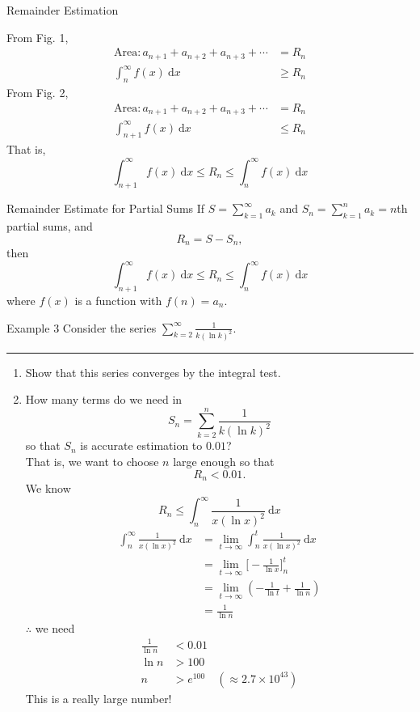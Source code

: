 \documentclass[12pt,a4paper]{article}
\def\d{{\mathrm{d}}}
\def\dx{\d x}
\begin{document}
\begin{eg}{Remainder Estimation}
\begin{itemize}
	From Fig. 1, $$\begin{aligned}\text{Area}: a_{n+1}+a_{n+2}+a_{n+3}+\cdots &=R_n\\ \int_n^\infty f(x)\ \dx &\geq R_n \end{aligned}$$
 	From Fig. 2, $$\begin{aligned}\text{Area}: a_{n+1}+a_{n+2}+a_{n+3}+\cdots &=R_n\\ \int_{n+1}^\infty f(x)\ \dx &\leq R_n \end{aligned}$$
 	That is, 
 	$$\int_{n+1}^\infty f(x)\ \dx\leq R_n\leq\int_n^\infty f(x)\ \dx$$
	\end{itemize}
\end{eg}
\begin{thm}{Remainder Estimate for Partial Sums}
	If $\displaystyle S=\sum_{k=1}^\infty{a_k}$ and $\displaystyle S_n=\sum_{k=1}^n{a_k}=n$th partial sums, and $$R_n=S-S_n,$$ then $$\int_{n+1}^\infty f(x)\ \dx\leq R_n\leq\int_n^\infty f(x)\ \dx$$	 where $f(x)$ is a function with $f(n)=a_n.$
\end{thm}
\begin{eg}{Example 3}
	Consider the series $\displaystyle\sum_{k=2}^\infty\frac{1}{k(\ln{k})^2}$.\\
	\noindent\rule[0.25\baselineskip]{\textwidth}{1pt}
	\begin{enumerate}
		\item Show that this series converges by the integral test.
		\item How many terms do we need in $$S_n=\sum_{k=2}^n\frac{1}{k(\ln{k})^2}$$ so that $S_n$ is accurate estimation to $0.01$? \\
		That is, we want to choose $n$ large enough so that $$R_n<0.01.$$	
		We know $$R_n\leq\int_n^\infty\frac{1}{x(\ln{x})^2}\ \dx$$
		$$\begin{aligned}
			\int_n^\infty\frac{1}{x(\ln{x})^2}\ \dx&=\lim_{t\to\infty}\int_n^t\frac{1}{x(\ln{x})^2}\ \dx\\
			&=\lim_{t\to\infty}\bigg[-\frac{1}{\ln{x}}\bigg]_n^t\\
			&=\lim_{t\to\infty}\left(-\frac{1}{\ln{t}}+\frac{1}{\ln{n}}\right)\\
			&=\frac{1}{\ln{n}}
		\end{aligned}$$
		$\therefore$ we need $$\begin{aligned}
			\frac{1}{\ln{n}}&<0.01\\
			\ln{n}&>100\\
			n&>e^{100}\quad(\approx2.7\times10^{43})
		\end{aligned}$$
		This is a really large number!
	\end{enumerate}
\end{eg}
\end{document}
